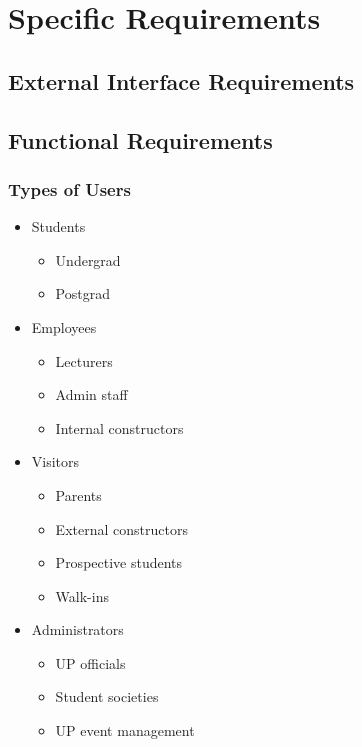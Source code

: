 \documentclass[12pt, a4paper]{article}
\begin{document}
\section{Specific Requirements}
	\subsection{External Interface Requirements}
	\subsection{Functional Requirements}
		\subsubsection{Types of Users}
			\begin{itemize}
				\item Students
				\begin{itemize}
					\item Undergrad
					\item Postgrad
				\end{itemize}
				
				\item Employees
				\begin{itemize}
					\item Lecturers
					\item Admin staff
					\item Internal constructors
				\end{itemize}
				
				\item Visitors
				\begin{itemize}
					\item Parents
					\item External constructors
					\item Prospective students
					\item Walk-ins
				\end{itemize}
				
				\item Administrators
				\begin{itemize}
					\item UP officials
					\item Student societies
					\item UP event management
				\end{itemize}
			\end{itemize}
\end{document}
